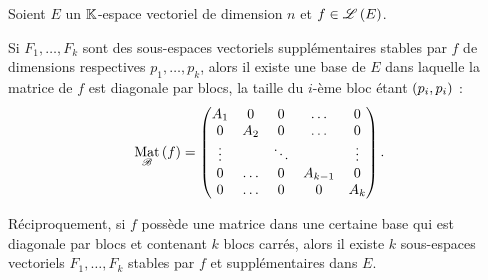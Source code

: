 \begin{prop}
Soient \(E\) un \(\mathbb{K}\)-espace vectoriel de dimension \(n\) et \(f\in\mathscr{L}\left(E\right)\).

Si \(F_1,\dots,F_k\) sont des sous-espaces vectoriels supplémentaires stables par \(f\) de dimensions respectives \(p_1,\dots,p_k\), alors il existe une base de \(E\) dans laquelle la matrice de \(f\) est diagonale par blocs, la taille du \(i\)-ème bloc étant \(\left(p_i,p_i\right)\) : \[\Mat{f}=\begin{pmatrix}
A_1 & 0 & 0 & \dots & 0 \\
0 & A_2 & 0 & \dots & 0 \\
\vdots &  & \ddots &  & \vdots \\
0 & \dots & 0 & A_{k-1} & 0 \\
0 & \dots & 0 & 0 & A_k
\end{pmatrix}.\]

Réciproquement, si \(f\) possède une matrice dans une certaine base qui est diagonale par blocs et contenant \(k\) blocs carrés, alors il existe \(k\) sous-espaces vectoriels \(F_1,\dots,F_k\) stables par \(f\) et supplémentaires dans \(E\).
\end{prop}

